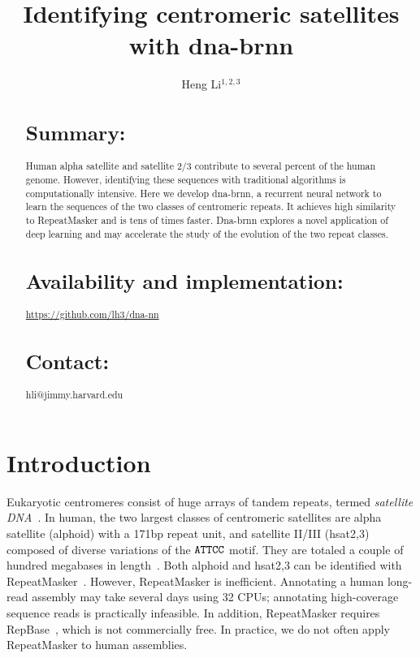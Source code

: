 \documentclass{bioinfo}
\begin{document}

\title{Identifying centromeric satellites with dna-brnn}
\author[Li]{Heng Li$^{1,2,3}$}
\address{$^1$ Department of data sciences, Dana-Farber Cancer Institute, 450 Brookline Ave, Boston, MA 02115, USA\\
$^2$ Department of biomedical informatics, Harvard Medical School, 25 Shattuck Street, Boston, MA 02115, USA\\
$^3$ Broad Institute, 415 Main St, Cambridge, MA 02142, USA}

\maketitle

\begin{abstract}

\section{Summary:} Human alpha satellite and satellite 2/3 contribute to
several percent of the human genome. However, identifying these sequences with
traditional algorithms is computationally intensive. Here we develop dna-brnn,
a recurrent neural network to learn the sequences of the two classes of
centromeric repeats. It achieves high similarity to RepeatMasker and is tens of
times faster. Dna-brnn explores a novel application of deep learning and may
accelerate the study of the evolution of the two repeat classes.

\section{Availability and implementation:}
\href{https://github.com/lh3/dna-nn}{https://github.com/lh3/dna-nn}

\section{Contact:} hli@jimmy.harvard.edu
\end{abstract}

\section{Introduction}

Eukaryotic centromeres consist of huge arrays of tandem repeats, termed
\emph{satellite DNA}~\citep{Garrido-Ramos:2017aa}. In human, the two largest
classes of centromeric satellites are alpha satellite (alphoid) with a 171bp
repeat unit, and satellite II/III (hsat2,3) composed of diverse variations of
the ${\tt ATTCC}$ motif. They are totaled a couple of hundred megabases in
length~\citep{Schneider:2017aa}. Both alphoid and hsat2,3 can be identified
with RepeatMasker~\citep{Tarailo-Graovac:2009aa}. However, RepeatMasker is
inefficient. Annotating a human long-read assembly may take several days using
32 CPUs; annotating high-coverage sequence reads is practically infeasible. In addition, RepeatMasker requires RepBase~\citep{Kapitonov:2008aa},
which is not commercially free. In practice, we do not often apply RepeatMasker
to human assemblies.
\end{document}
